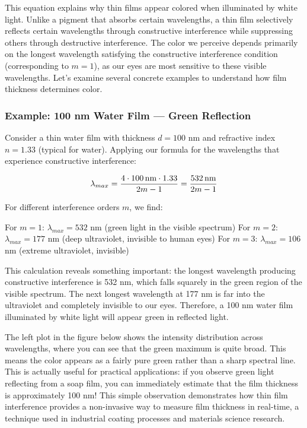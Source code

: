 \documentclass[
  a4paper,
]{book}
\begin{document}
This equation explains why thin films appear colored when illuminated by
white light. Unlike a pigment that absorbs certain wavelengths, a thin
film selectively reflects certain wavelengths through constructive
interference while suppressing others through destructive interference.
The color we perceive depends primarily on the longest wavelength
satisfying the constructive interference condition (corresponding to
\(m = 1\)), as our eyes are most sensitive to these visible wavelengths.
Let's examine several concrete examples to understand how film thickness
determines color.

\subsubsection{Example: 100 nm Water Film --- Green
Reflection}\label{example-100-nm-water-film-green-reflection}

Consider a thin water film with thickness \(d = 100\) nm and refractive
index \(n = 1.33\) (typical for water). Applying our formula for the
wavelengths that experience constructive interference:

\[
\lambda_{max}=\frac{4\cdot 100\, {\rm nm} \cdot 1.33}{2m-1} = \frac{532\, {\rm nm}}{2m-1}
\]

For different interference orders \(m\), we find:

For \(m = 1\): \(\lambda_{max} = 532\) nm (green light in the visible
spectrum) For \(m = 2\): \(\lambda_{max} = 177\) nm (deep ultraviolet,
invisible to human eyes) For \(m = 3\): \(\lambda_{max} = 106\) nm
(extreme ultraviolet, invisible)

This calculation reveals something important: the longest wavelength
producing constructive interference is 532 nm, which falls squarely in
the green region of the visible spectrum. The next longest wavelength at
177 nm is far into the ultraviolet and completely invisible to our eyes.
Therefore, a 100 nm water film illuminated by white light will appear
green in reflected light.

The left plot in the figure below shows the intensity distribution
across wavelengths, where you can see that the green maximum is quite
broad. This means the color appears as a fairly pure green rather than a
sharp spectral line. This is actually useful for practical applications:
if you observe green light reflecting from a soap film, you can
immediately estimate that the film thickness is approximately 100 nm!
This simple observation demonstrates how thin film interference provides
a non-invasive way to measure film thickness in real-time, a technique
used in industrial coating processes and materials science research.
\end{document}
